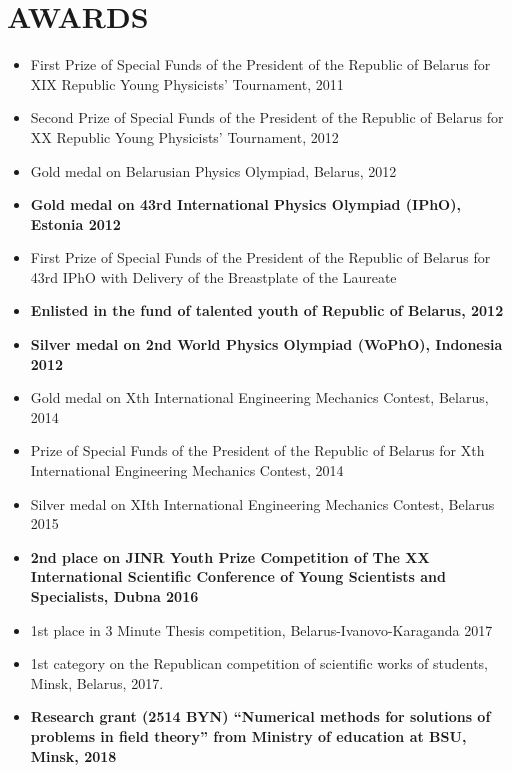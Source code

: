 \documentclass[paper=a4,fontsize=11pt]{scrartcl} %
\newcommand{\NewPart}[1]{\section*{\uppercase{#1}}}
\begin{document}
\NewPart{Awards}{}
\begin{itemize}
\item First Prize of Special Funds of the President of the Republic of Belarus for XIX Republic Young Physicists' Tournament, 2011
\item Second Prize of Special Funds of the President of the Republic of Belarus for XX Republic Young Physicists' Tournament, 2012
\item Gold medal on Belarusian Physics Olympiad, Belarus, 2012
\item \textbf{Gold medal on 43rd International Physics Olympiad (IPhO), Estonia 2012}
\item First Prize of Special Funds of the President of the Republic of Belarus for 43rd IPhO with Delivery of the Breastplate of the Laureate
\item \textbf{Enlisted in the fund of talented youth of Republic of Belarus, 2012}
\item \textbf{Silver medal on 2nd World Physics Olympiad (WoPhO), Indonesia 2012}
\item Gold medal on Xth International Engineering Mechanics Contest, Belarus, 2014
\item Prize of Special Funds of the President of the Republic of Belarus for Xth International Engineering Mechanics Contest, 2014
\item Silver medal on XIth International Engineering Mechanics Contest, Belarus 2015
\item \textbf{2nd place on JINR Youth Prize Competition of The XX International Scientific Conference of Young Scientists and Specialists, Dubna 2016}
\item 1st place in 3 Minute Thesis competition, Belarus-Ivanovo-Karaganda 2017
\item 1st category on the Republican competition of scientific works of students, Minsk, Belarus, 2017.
\item \textbf{Research grant (2514 BYN) “Numerical methods for solutions of problems in field theory” from Ministry of education at BSU, Minsk, 2018}
\end{itemize}
\end{document}
